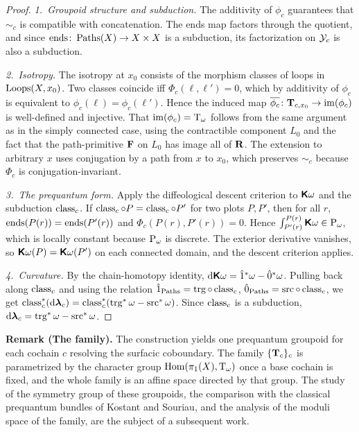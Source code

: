 \documentclass[11pt,reqno,letterpaper,twoside]{amsart}
\begin{document}
  \begin{proof}
    \textit{1.~Groupoid structure and subduction.}
    The additivity of $\phi_c$ guarantees that $\sim_c$ is compatible with concatenation.
    The ends map factors through the quotient,
    and since $\operatorname{ends} \colon \operatorname{Paths}(X) \to X \times X$ is a subduction,
    its factorization on $\mathcal{Y}_c$ is also a subduction.
    
    \textit{2.~Isotropy.}
    The isotropy at $x_0$ consists of the morphism classes of loops in $\operatorname{Loops}(X, x_0)$.
    Two classes coincide iff $\Phi_c(\ell, \ell') = 0$,
    which by additivity of $\phi_c$ is equivalent to $\phi_c(\ell) = \phi_c(\ell')$.
    Hence the induced map $\overline{\phi_c} \colon \mathbf{T}_{c, x_0} \to \operatorname{im}(\phi_c)$ is well-defined and injective.
    That $\operatorname{im}(\phi_c) = \mathrm{T}_\omega$ follows from the same argument as in the simply connected case,
    using the contractible component $L_0$ and the fact that the path-primitive ${\mathbf F}$ on $L_0$ has image all of ${\mathbf{R}}$.
    The extension to arbitrary $x$ uses conjugation by a path from $x$ to $x_0$,
    which preserves $\sim_c$ because $\Phi_c$ is conjugation-invariant.
    
    \textit{3.~The prequantum form.}
    Apply the diffeological descent criterion to $\boldsymbol{\mathsf{K}}\omega$ and the subduction $\operatorname{class}_c$.
    If $\operatorname{class}_c \circ P = \operatorname{class}_c \circ P'$ for two plots $P, P'$,
    then for all $r$,
    $\operatorname{ends}(P(r)) = \operatorname{ends}(P'(r))$ and $\Phi_c(P(r), P'(r)) = 0$.
    Hence $\int_{P'(r)}^{P(r)} \boldsymbol{\mathsf{K}}\omega \in \operatorname{P}_\omega$,
    which is locally constant because $\operatorname{P}_\omega$ is discrete.
    The exterior derivative vanishes,
    so $\boldsymbol{\mathsf{K}}\omega(P) = \boldsymbol{\mathsf{K}}\omega(P')$ on each connected domain,
    and the descent criterion applies.
    
    \textit{4.~Curvature.}
    By the chain-homotopy identity,
    $\mathrm{d}\boldsymbol{\mathsf{K}}\omega = \hat 1^*\omega - \hat 0^*\omega$.
    Pulling back along $\operatorname{class}_c$ and using the relation $\hat 1_{\operatorname{Paths}} = \operatorname{trg} \circ \operatorname{class}_c$, $\hat 0_{\operatorname{Paths}} = \operatorname{src} \circ \operatorname{class}_c$,
    we get $\operatorname{class}_c^*(\mathrm{d}\boldsymbol \lambda_c) = \operatorname{class}_c^*(\operatorname{trg}^*\omega - \operatorname{src}^*\omega)$.
    Since $\operatorname{class}_c$ is a subduction,
    $\mathrm{d}\boldsymbol \lambda_c = \operatorname{trg}^*\omega - \operatorname{src}^*\omega$.
  \end{proof}
  
  \textbf{Remark (The family).}
  The construction yields one prequantum groupoid for each cochain $c$ resolving the surfacic coboundary.
  The family $\{\mathbf{T}_c\}_c$ is parametrized by the character group $\mathrm{Hom}(\pi_1(X), \mathrm{T}_\omega)$ once a base cochain is fixed,
  and the whole family is an affine space directed by that group.
  The study of the symmetry group of these groupoids,
  the comparison with the classical prequantum bundles of Kostant and Souriau,
  and the analysis of the moduli space of the family,
  are the subject of a subsequent work.
  
\end{document}
